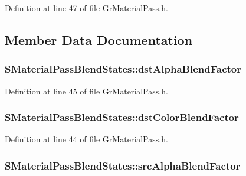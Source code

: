 Definition at line 47 of file GrMaterialPass.h.

\subsection{Member Data Documentation}
\hypertarget{struct_s_material_pass_blend_states_8c63ffc9017a3e850dbba2ecf9d55636}{
\subsubsection[{dstAlphaBlendFactor}]{ {\bf SMaterialPassBlendStates::dstAlphaBlendFactor}}}
\label{struct_s_material_pass_blend_states_8c63ffc9017a3e850dbba2ecf9d55636}




Definition at line 45 of file GrMaterialPass.h.\hypertarget{struct_s_material_pass_blend_states_5e75b2942d23722d7886bccc5612d1b6}{
\subsubsection[{dstColorBlendFactor}]{ {\bf SMaterialPassBlendStates::dstColorBlendFactor}}}
\label{struct_s_material_pass_blend_states_5e75b2942d23722d7886bccc5612d1b6}




Definition at line 44 of file GrMaterialPass.h.\hypertarget{struct_s_material_pass_blend_states_26219f41c410a0c020e84c2a7bc32eab}{
\subsubsection[{srcAlphaBlendFactor}]{ {\bf SMaterialPassBlendStates::srcAlphaBlendFactor}}}
\label{struct_s_material_pass_blend_states_26219f41c410a0c020e84c2a7bc32eab}




